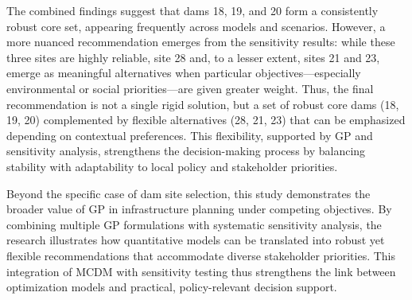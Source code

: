 The combined findings suggest that dams 18, 19,  and 20 form a consistently robust core set, appearing frequently across models and scenarios. However, a more nuanced recommendation emerges from the sensitivity results: while these three sites are highly reliable, site 28 and, to a lesser extent, sites 21 and 23, emerge as meaningful alternatives when particular objectives—especially environmental or social priorities—are given greater weight. Thus, the final recommendation is not a single rigid solution, but a set of robust core dams (18, 19, 20) complemented by flexible alternatives (28, 21, 23) that can be emphasized depending on contextual preferences. This flexibility, supported by \gls{GP} and sensitivity analysis, strengthens the decision-making process by balancing stability with adaptability to local policy and stakeholder priorities.

Beyond the specific case of dam site selection, this study demonstrates the broader value of \gls{GP} in infrastructure planning under competing objectives. By combining multiple \gls{GP} formulations with systematic sensitivity analysis, the research illustrates how quantitative models can be translated into robust yet flexible recommendations that accommodate diverse stakeholder priorities. This integration of MCDM with sensitivity testing thus strengthens the link between optimization models and practical, policy-relevant decision support.